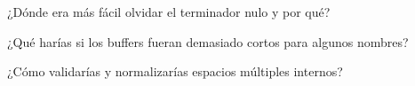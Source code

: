 
\begin{DoxyEnumerate}
\item ¿\+Dónde era más fácil olvidar el terminador nulo y por qué?
\item ¿\+Qué harías si los buffers fueran demasiado cortos para algunos nombres?
\item ¿\+Cómo validarías y normalizarías espacios múltiples internos? 
\end{DoxyEnumerate}
